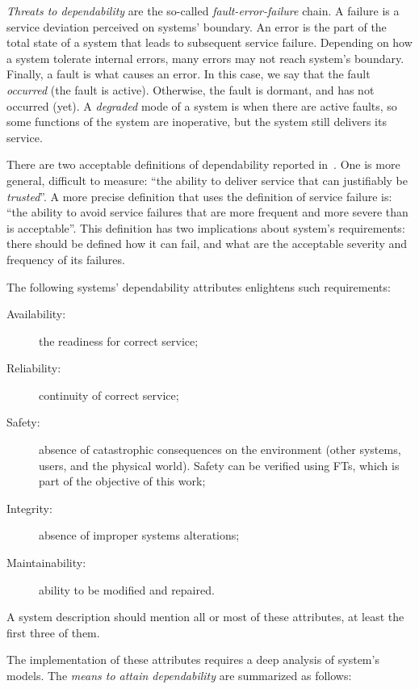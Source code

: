 \documentclass[12pt,openright,twoside,a4paper,oldfontcommands,english,brazil,final]{abntex2}
\theoremstyle{theo}
\begin{document}
\emph{Threats to dependability} are the so-called \emph{fault-error-failure} chain.
A failure is a service deviation perceived on systems' boundary.
An error is the part of the total state of a system that leads to subsequent service failure.
Depending on how a system tolerate internal errors, many errors may not reach system's boundary.
Finally, a fault is what causes an error.
In this case, we say that the fault \emph{occurred} (the fault is active).
Otherwise, the fault is dormant, and has not occurred (yet).
A \emph{degraded} mode of a system is when there are active faults, so some functions of the system are inoperative, but the system still delivers its service.

There are two acceptable definitions of dependability reported in~\cite{ALR+2004}.
One is more general, difficult to measure: ``the ability to deliver service that can justifiably be \emph{trusted}''.
A more precise definition that uses the definition of service failure is: ``the ability to avoid service failures that are more frequent and more severe than is acceptable''.
This definition has two implications about system's requirements: there should be defined how it can fail, and what are the acceptable severity and frequency of its failures.

The following systems' dependability attributes enlightens such requirements:
\begin{description}
  \item[Availability:] the readiness for correct service;
  \item[Reliability:] continuity of correct service;
  \item[Safety:] absence of catastrophic consequences on the environment (other systems, users, and the physical world).
  Safety can be verified using \acp{FT}, which is part of the objective of this work;
  \item[Integrity:] absence of improper systems alterations;
  \item[Maintainability:] ability to be modified and repaired.
\end{description}
%
A system description should mention all or most of these attributes, at least the first three of them.

The implementation of these attributes requires a deep analysis of system's models.
The \emph{means to attain dependability} are summarized as follows:
\end{document}
